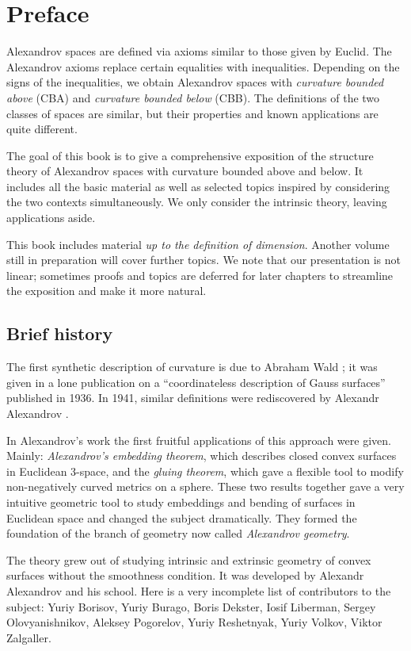\chapter*{Preface}

Alexandrov spaces are defined via axioms similar to those given by Euclid.
The Alexandrov axioms replace certain  equalities with inequalities. 
Depending on the signs of the inequalities, we obtain Alexandrov spaces with {}\emph{curvature bounded above} (CBA) and {}\emph{curvature bounded below} (CBB).
The definitions of the two classes of spaces are similar, but their properties and known applications are quite different.

The goal of this book is to give a comprehensive exposition of the structure theory of Alexandrov spaces 
with curvature bounded above and below.
It includes all the basic material as well as selected topics inspired by considering the two contexts simultaneously.
We only consider  the intrinsic theory, leaving applications aside. 

This book includes material \emph{up to the definition of dimension}.
Another volume still in preparation will cover further topics.
We note that our presentation is not linear;
sometimes proofs and topics are deferred for later chapters to streamline the exposition and make it more natural.

\section*{Brief history}

The first synthetic description of curvature is due to Abraham Wald \cite{wald}; 
it was given in a lone publication on a ``coordinateless description of Gauss surfaces'' published in 1936.
In 1941, similar definitions were rediscovered by Alexandr Alexandrov \cite{alexandrov:def}.

In Alexandrov's work the first fruitful applications of this approach were given.
Mainly: {}\emph{Alexandrov's embedding theorem}, which describes closed convex surfaces in Euclidean 3-space,
and the {}\emph{gluing theorem}, which gave a flexible tool to modify non-negatively curved metrics on a sphere.
These two results together gave  a very intuitive geometric tool to study embeddings and bending of surfaces in Euclidean space and changed the subject dramatically.
They formed the foundation of the branch of geometry now called {}\emph{Alexandrov geometry}.


The theory grew out of studying intrinsic and extrinsic geometry of convex surfaces without the smoothness condition.
It was developed by Alexandr Alexandrov
and his school.
Here is a very incomplete list of contributors to the subject:
Yuriy  Borisov,
Yuriy  Burago,
Boris Dekster,
Iosif  Liberman,
Sergey  Olovyanishnikov,
Aleksey  Pogorelov,
Yuriy  Reshetnyak,
Yuriy  Volkov,
Viktor  Zalgaller.

